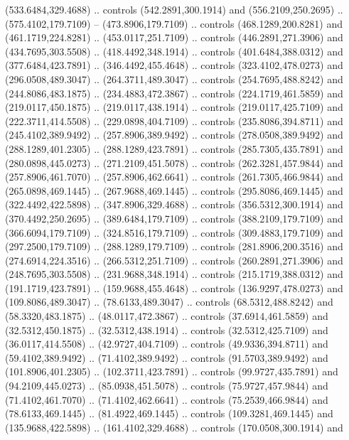 {{\begin{scope}[y=-0.80pt,x=0.80pt,scale=0.038,xshift=-330pt,yshift=200pt]
        (533.6484,329.4688) .. controls (542.2891,300.1914) and (556.2109,250.2695) ..
        (575.4102,179.7109) -- (473.8906,179.7109) .. controls (468.1289,200.8281) and
        (461.1719,224.8281) .. (453.0117,251.7109) .. controls (446.2891,271.3906) and
        (434.7695,303.5508) .. (418.4492,348.1914) .. controls (401.6484,388.0312) and
        (377.6484,423.7891) .. (346.4492,455.4648) .. controls (323.4102,478.0273) and
        (296.0508,489.3047) .. (264.3711,489.3047) .. controls (254.7695,488.8242) and
        (244.8086,483.1875) .. (234.4883,472.3867) .. controls (224.1719,461.5859) and
        (219.0117,450.1875) .. (219.0117,438.1914) .. controls (219.0117,425.7109) and
        (222.3711,414.5508) .. (229.0898,404.7109) .. controls (235.8086,394.8711) and
        (245.4102,389.9492) .. (257.8906,389.9492) .. controls (278.0508,389.9492) and
        (288.1289,401.2305) .. (288.1289,423.7891) .. controls (285.7305,435.7891) and
        (280.0898,445.0273) .. (271.2109,451.5078) .. controls (262.3281,457.9844) and
        (257.8906,461.7070) .. (257.8906,462.6641) .. controls (261.7305,466.9844) and
        (265.0898,469.1445) .. (267.9688,469.1445) .. controls (295.8086,469.1445) and
        (322.4492,422.5898) .. (347.8906,329.4688) .. controls (356.5312,300.1914) and
        (370.4492,250.2695) .. (389.6484,179.7109) .. controls (388.2109,179.7109) and
        (366.6094,179.7109) .. (324.8516,179.7109) .. controls (309.4883,179.7109) and
        (297.2500,179.7109) .. (288.1289,179.7109) .. controls (281.8906,200.3516) and
        (274.6914,224.3516) .. (266.5312,251.7109) .. controls (260.2891,271.3906) and
        (248.7695,303.5508) .. (231.9688,348.1914) .. controls (215.1719,388.0312) and
        (191.1719,423.7891) .. (159.9688,455.4648) .. controls (136.9297,478.0273) and
        (109.8086,489.3047) .. (78.6133,489.3047) .. controls (68.5312,488.8242) and
        (58.3320,483.1875) .. (48.0117,472.3867) .. controls (37.6914,461.5859) and
        (32.5312,450.1875) .. (32.5312,438.1914) .. controls (32.5312,425.7109) and
        (36.0117,414.5508) .. (42.9727,404.7109) .. controls (49.9336,394.8711) and
        (59.4102,389.9492) .. (71.4102,389.9492) .. controls (91.5703,389.9492) and
        (101.8906,401.2305) .. (102.3711,423.7891) .. controls (99.9727,435.7891) and
        (94.2109,445.0273) .. (85.0938,451.5078) .. controls (75.9727,457.9844) and
        (71.4102,461.7070) .. (71.4102,462.6641) .. controls (75.2539,466.9844) and
        (78.6133,469.1445) .. (81.4922,469.1445) .. controls (109.3281,469.1445) and
        (135.9688,422.5898) .. (161.4102,329.4688) .. controls (170.0508,300.1914) and

\end{scope}}}
